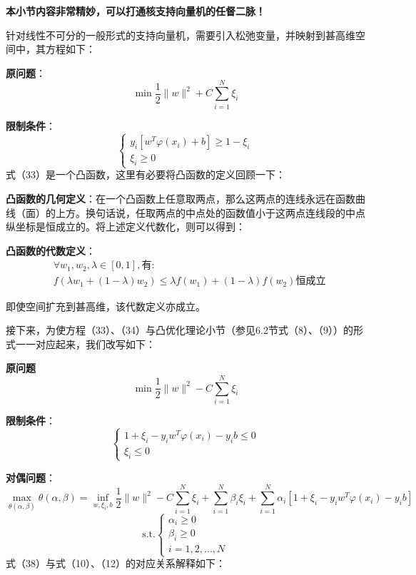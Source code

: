 \textbf{本小节内容非常精妙，可以打通核支持向量机的任督二脉！}

针对线性不可分的一般形式的支持向量机，需要引入松弛变量，并映射到甚高维空间中，其方程如下：

\textbf{原问题}：
\begin{equation}\min\frac12\|w\|^2+C\sum_{i=1}^N\xi_i\end{equation}

\textbf{限制条件}：
\begin{equation}\begin{cases}y_i[w^T\varphi(x_i)+b]\geq1-\xi_i\\\xi_i\geq0\end{cases}\end{equation}
式（33）是一个凸函数，这里有必要将凸函数的定义回顾一下：

\textbf{凸函数的几何定义}：在一个凸函数上任意取两点，那么这两点的连线永远在函数曲线（面）的上方。换句话说，任取两点的中点处的函数值小于这两点连线段的中点纵坐标是恒成立的。将上述定义代数化，则可以得到：

\textbf{凸函数的代数定义}：
\begin{equation}\begin{aligned}&\forall w_1,w_2,\lambda\in[0,1],\text{有}:\\&f(\lambda w_1+(1-\lambda)w_2)\leq\lambda f(w_1)+(1-\lambda)f(w_2)\text{恒成立}\end{aligned}\end{equation}

即使空间扩充到甚高维，该代数定义亦成立。

接下来，为使方程（33）、（34）与凸优化理论小节（参见6.2节式（8）、（9））的形式一一对应起来，我们改写如下：

\textbf{原问题}
\begin{equation}\min\frac12\|w\|^2-C\sum_{i=1}^N\xi_i\end{equation}

\textbf{限制条件}：
\begin{equation}\begin{cases}1+\xi_i-y_iw^T\varphi(x_i)-y_ib\leq0\\\xi_i\leq0\end{cases}\end{equation}

\textbf{对偶问题}：
\begin{equation}
\max_{\theta(\alpha,\beta)} \theta(\alpha,\beta) = \inf_{w,\xi_i,b} \frac{1}{2} \|w\|^2 - C \sum_{i=1}^N \xi_i + \sum_{i=1}^N \beta_i \xi_i + \sum_{i=1}^N \alpha_i [1 + \xi_i - y_i w^T \varphi(x_i) - y_i b]
\end{equation}
\begin{equation*}
	\text{s.t.}\left\{
	\begin{array}{l}
		\alpha_i \geq 0 \\
		\beta_i \geq 0 \\
		i = 1,2,...,N
	\end{array}
	\right.
\end{equation*}
式（38）与式（10）、（12）的对应关系解释如下：

